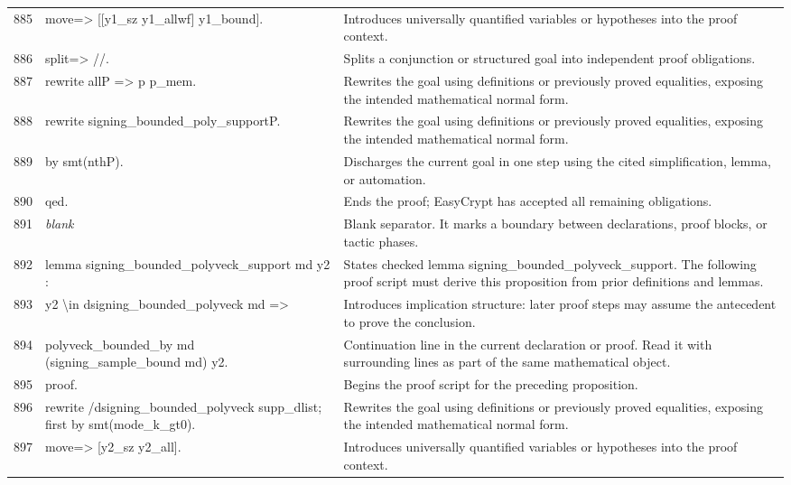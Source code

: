 \documentclass[10pt]{article}
\begin{document}
\begin{longtable}{r L{0.53\textwidth} L{0.37\textwidth}}
885 & {\ttfamily\scriptsize move=> [[y1\_sz y1\_allwf] y1\_bound].} & Introduces universally quantified variables or hypotheses into the proof context. \\
886 & {\ttfamily\scriptsize split=> //.} & Splits a conjunction or structured goal into independent proof obligations. \\
887 & {\ttfamily\scriptsize rewrite allP => p p\_mem.} & Rewrites the goal using definitions or previously proved equalities, exposing the intended mathematical normal form. \\
888 & {\ttfamily\scriptsize rewrite signing\_bounded\_poly\_supportP.} & Rewrites the goal using definitions or previously proved equalities, exposing the intended mathematical normal form. \\
889 & {\ttfamily\scriptsize by smt(nthP).} & Discharges the current goal in one step using the cited simplification, lemma, or automation. \\
890 & {\ttfamily\scriptsize qed.} & Ends the proof; EasyCrypt has accepted all remaining obligations. \\
891 & {\ttfamily\scriptsize \emph{blank}} & Blank separator.  It marks a boundary between declarations, proof blocks, or tactic phases. \\
892 & {\ttfamily\scriptsize lemma signing\_bounded\_polyveck\_support md y2 :} & States checked lemma signing\_bounded\_polyveck\_support.  The following proof script must derive this proposition from prior definitions and lemmas. \\
893 & {\ttfamily\scriptsize   y2 \textbackslash{}in dsigning\_bounded\_polyveck md =>} & Introduces implication structure: later proof steps may assume the antecedent to prove the conclusion. \\
894 & {\ttfamily\scriptsize   polyveck\_bounded\_by md (signing\_sample\_bound md) y2.} & Continuation line in the current declaration or proof.  Read it with surrounding lines as part of the same mathematical object. \\
895 & {\ttfamily\scriptsize proof.} & Begins the proof script for the preceding proposition. \\
896 & {\ttfamily\scriptsize rewrite /dsigning\_bounded\_polyveck supp\_dlist; first by smt(mode\_k\_gt0).} & Rewrites the goal using definitions or previously proved equalities, exposing the intended mathematical normal form. \\
897 & {\ttfamily\scriptsize move=> [y2\_sz y2\_all].} & Introduces universally quantified variables or hypotheses into the proof context. \\

\end{longtable}
\end{document}
